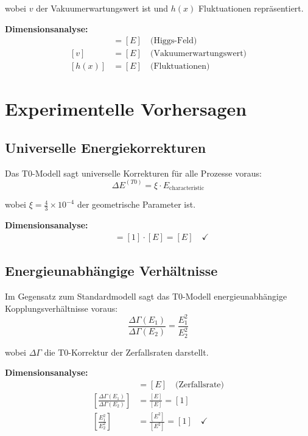 \documentclass[12pt,a4paper]{report}
\begin{document}
	wobei $v$ der Vakuumerwartungswert ist und $h(x)$ Fluktuationen repräsentiert.
	
	\textbf{Dimensionsanalyse:}
	\begin{align}
		[\Phi] &= [E] \quad \text{(Higgs-Feld)} \\
		[v] &= [E] \quad \text{(Vakuumerwartungswert)} \\
		[h(x)] &= [E] \quad \text{(Fluktuationen)}
	\end{align}
	
	\section{Experimentelle Vorhersagen}
	\label{sec:experimental_predictions}
	
	\subsection{Universelle Energiekorrekturen}
	\label{subsec:universal_energy_corrections}
	
	Das T0-Modell sagt universelle Korrekturen für alle Prozesse voraus:
	\begin{equation}
		\Delta E^{(T0)} = \xi \cdot E_{\text{characteristic}}
	\end{equation}
	
	wobei $\xi = \frac{4}{3} \times 10^{-4}$ der geometrische Parameter ist.
	
	\textbf{Dimensionsanalyse:}
	\begin{align}
		[\Delta E^{(T0)}] &= [1] \cdot [E] = [E] \quad \checkmark
	\end{align}
	
	\subsection{Energieunabhängige Verhältnisse}
	\label{subsec:energy_independent_ratios}
	
	Im Gegensatz zum Standardmodell sagt das T0-Modell energieunabhängige Kopplungsverhältnisse voraus:
	\begin{equation}
		\frac{\Delta\Gamma(E_1)}{\Delta\Gamma(E_2)} = \frac{E_1^2}{E_2^2}
	\end{equation}
	
	wobei $\Delta\Gamma$ die T0-Korrektur der Zerfallsraten darstellt.
	
	\textbf{Dimensionsanalyse:}
	\begin{align}
		[\Delta\Gamma] &= [E] \quad \text{(Zerfallsrate)} \\
		\left[\frac{\Delta\Gamma(E_1)}{\Delta\Gamma(E_2)}\right] &= \frac{[E]}{[E]} = [1] \\
		\left[\frac{E_1^2}{E_2^2}\right] &= \frac{[E^2]}{[E^2]} = [1] \quad \checkmark
	\end{align}
	
\end{document}
